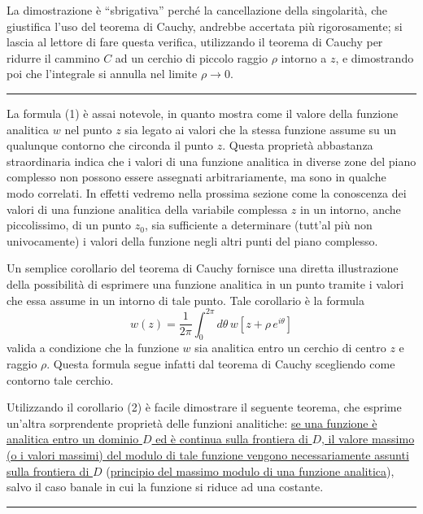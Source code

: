 \documentclass[11pt, a4paper]{book}
\numberwithin{equation}{section}
\begin{document}
La dimostrazione è ``sbrigativa'' perché la cancellazione della singolarità, che giustifica l'uso del teorema di Cauchy, andrebbe accertata più rigorosamente; si lascia al lettore di fare questa verifica, utilizzando il teorema di Cauchy per ridurre il cammino $C$ ad un cerchio di piccolo raggio $\rho$ intorno a $z$, e dimostrando poi che l'integrale si annulla nel limite $\rho \to 0$.

\medskip\hrule\medskip

La formula (1) è assai notevole, in quanto mostra come il valore della funzione analitica $w$ nel punto $z$ sia legato ai valori che la stessa funzione assume su un qualunque contorno che circonda il punto $z$. Questa proprietà abbastanza straordinaria indica che i valori di una funzione analitica in diverse zone del piano complesso non possono essere assegnati arbitrariamente, ma sono in qualche modo correlati. In effetti vedremo nella prossima sezione come la conoscenza dei valori di una funzione analitica della variabile complessa $z$ in un intorno, anche piccolissimo, di un punto $z_0$, sia sufficiente a determinare (tutt'al più non univocamente) i valori della funzione negli altri punti del piano complesso.

Un semplice corollario del teorema di Cauchy fornisce una diretta illustrazione della possibilità di esprimere una funzione analitica in un punto tramite i valori che essa assume in un intorno di tale punto. Tale corollario è la formula
\begin{equation}
w(z) = \frac{1}{2\pi} \int_0^{2\pi} d\theta\, w\!\left[z + \rho\, e^{i\theta}\right] \tag{2}
\end{equation}
valida a condizione che la funzione $w$ sia analitica entro un cerchio di centro $z$ e raggio $\rho$. Questa formula segue infatti dal teorema di Cauchy scegliendo come contorno tale cerchio.

Utilizzando il corollario (2) è facile dimostrare il seguente teorema, che esprime un'altra sorprendente proprietà delle funzioni analitiche: \underline{se una funzione è analitica entro un dominio $D$ ed è continua sulla frontiera di $D$, il valore massimo (o i valori massimi) del modulo di tale funzione vengono necessariamente assunti sulla frontiera di $D$} (\underline{principio del massimo modulo di una funzione analitica}), salvo il caso banale in cui la funzione si riduce ad una costante.

\medskip\hrule\medskip
\end{document}
